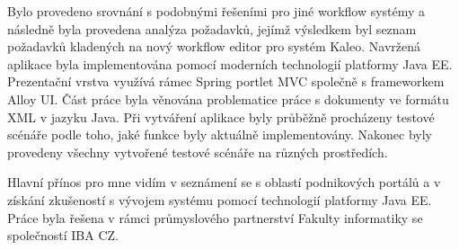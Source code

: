 \documentclass{fithesis}
\begin{document}
Bylo provedeno srovnání s podobnými řešeními pro jiné workflow systémy a následně byla provedena analýza požadavků, jejímž výsledkem byl seznam požadavků kladených na nový workflow editor pro systém Kaleo. Navržená aplikace byla implementována pomocí moderních technologií platformy Java EE. Prezentační vrstva využívá rámec Spring portlet MVC společně s frameworkem Alloy UI. Část práce byla věnována problematice práce s dokumenty ve formátu XML v jazyku Java. Při vytváření aplikace byly průběžně procházeny testové scénáře podle toho, jaké funkce byly aktuálně implementovány. Nakonec byly provedeny všechny vytvořené testové scénáře na různých prostředích.

Hlavní přínos pro mne vidím v seznámení se s oblastí podnikových portálů a v získání zkušeností s vývojem systému pomocí technologií platformy Java EE. Práce byla řešena v rámci průmyslového partnerství Fakulty informatiky se společností IBA CZ.




\end{document}
